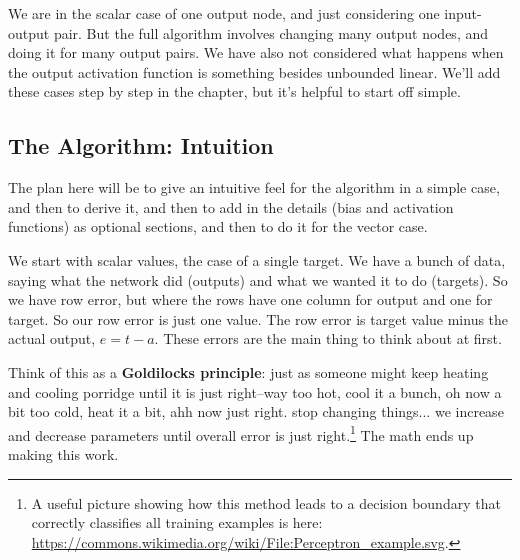 We are in the scalar case of one output node, and just considering one input-output pair. But the full algorithm involves changing many output nodes, and doing it for many output pairs.  We have also not considered what happens when the output activation function is something besides unbounded linear. We'll add these cases step by step in the chapter, but it's helpful to start off simple.


\subsection{The Algorithm: Intuition}

The plan here will be to give an intuitive feel for the algorithm in a simple case, and then to derive it, and then to add in the details (bias and activation functions) as optional sections, and then to do it for the vector case.

We start with scalar values, the case of a single target. We have a bunch of data, saying what the network did (outputs) and what we wanted it to do (targets). So we have row error, but where the rows have one column for output and one for target. So our row error is just one value. The row error is target value minus the actual output, $e = t-a$. These errors are the main thing to think about at first. 

Think of this as a  {\bf Goldilocks principle}: just as someone might keep heating and cooling porridge until it is just right--way too hot, cool it a bunch, oh now a bit too cold, heat it a bit, ahh now just right. stop changing things... we increase and decrease parameters until overall error is just right.\footnote{A useful picture showing how this method leads to a decision boundary that correctly classifies all training examples is here: \url{https://commons.wikimedia.org/wiki/File:Perceptron_example.svg}.} The math ends up making this work.

 

